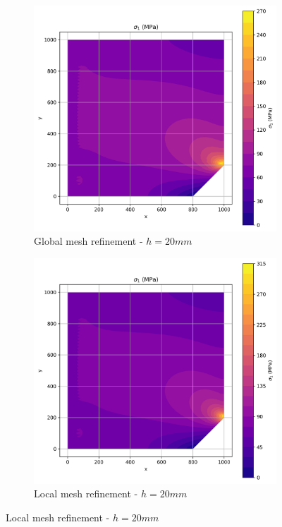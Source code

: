 \begin{figure}[H]
  \centering
  \begin{subfigure}[b]{0.45\textwidth}
    \centering
    \includegraphics[width=\textwidth]{GRAFICOS/Quad9/2mm_global/resultados - sigma_1.png}
    \caption{Global mesh refinement - $h=20mm$}
    \label{fig:img1}
  \end{subfigure}
  \hfill
  \begin{subfigure}[b]{0.45\textwidth}
    \centering
    \includegraphics[width=\textwidth]{GRAFICOS/Quad9/2mm_local/resultados - sigma_1.png}
    \caption{Local mesh refinement - $h=20mm$}
    \label{fig:img2}
  \end{subfigure}
\end{figure}

